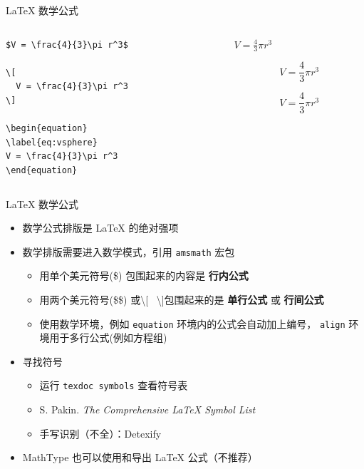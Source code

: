 \begin{frame}[fragile]{\LaTeX{} 数学公式}

\begin{columns}
\begin{column}{.5\textwidth}
\begin{lstlisting}[basicstyle=\ttfamily\small]
$V = \frac{4}{3}\pi r^3$

\[
  V = \frac{4}{3}\pi r^3
\]

\begin{equation}
\label{eq:vsphere}
V = \frac{4}{3}\pi r^3
\end{equation}
\end{lstlisting}
\end{column}

\begin{column}{.5\textwidth}
$V = \frac{4}{3}\pi r^3$

\[
  V = \frac{4}{3}\pi r^3
\]

\begin{equation}
\label{eq:vsphere}
V = \frac{4}{3}\pi r^3
\end{equation}
\end{column}
\end{columns}

\end{frame}

\begin{frame}[fragile]{\LaTeX{} 数学公式}
\begin{itemize}
\item 数学公式排版是 \LaTeX{} 的绝对强项
\item 数学排版需要进入数学模式，引用 \texttt{amsmath} 宏包
	\begin{itemize}
	\item 用单个美元符号(\$) 包围起来的内容是 {\bf 行内公式}
  \item 用两个美元符号(\$\$) 或\textbackslash{}[~ \textbackslash{}]包围起来的是 {\bf 单行公式} 或 {\bf 行间公式}
	\item 使用数学环境，例如 \texttt{equation} 环境内的公式会自动加上编号，
		\texttt{align} 环境用于多行公式(例如方程组)
  \end{itemize}
\item 寻找符号
    \begin{itemize}
      \item 运行 \texttt{texdoc symbols} 查看符号表
      \item S. Pakin. \emph{The Comprehensive \LaTeX{} Symbol List}
      \item 手写识别（不全）：Detexify 
    \end{itemize}
\item MathType 也可以使用和导出 \LaTeX{} 公式（不推荐）
\end{itemize}
\end{frame}


